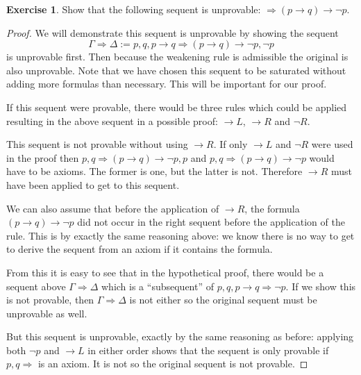 \documentclass{article}
\newcommand{\sequent}[2]{#1\Rightarrow#2}
\theoremstyle{definition}
\newtheorem{question}{Exercise}
\begin{document}
\begin{question}
    Show that the following sequent is unprovable: \(\sequent{}{(p\to q)\to\neg
        p}\).

    \begin{proof}
        We will demonstrate this sequent is unprovable by showing the sequent
        \[
            \sequent{\Gamma}{\Delta}:=\sequent{p,q,p\to q}{(p\to q)\to\neg p,\neg p}
        \]
        is unprovable first. Then because the weakening rule is admissible the
        original is also unprovable. Note that we have chosen this sequent to be
        saturated without adding more formulas than necessary. This will be
        important for our proof.

        If this sequent were provable, there would be three rules which could be
        applied resulting in the above sequent in a possible proof: \(\to L\),
        \(\to R\) and \(\neg R\).

        This sequent is not provable without using \(\to R\). If only \(\to L\)
        and \(\neg R\) were used in the proof then \(\sequent{p,q}{(p\to
            q)\to\neg p,p}\) and \(\sequent{p,q}{(p\to q)\to\neg p}\) would have to
        be axioms. The former is one, but the latter is not. Therefore \(\to R\)
        must have been applied to get to this sequent.

        We can also assume that before the application of \(\to R\), the formula
        \((p\to q)\to\neg p\) did not occur in the right sequent before the
        application of the rule. This is by exactly the same reasoning above:
        we know there is no way to get to derive the sequent from an axiom if
        it contains the formula.

        From this it is easy to see that in the hypothetical proof, there would
        be a sequent above \(\sequent{\Gamma}{\Delta}\) which is a
        ``subsequent'' of \(\sequent{p,q,p\to q}{\neg p}\). If we show this is
        not provable, then \(\sequent{\Gamma}{\Delta}\) is not either so the
        original sequent must be unprovable as well.

        But this sequent is unprovable, exactly by the same reasoning as before:
        applying both \(\neg p\) and \(\to L\) in either order shows that the
        sequent is only provable if \(\sequent{p,q}{}\) is an axiom. It is not
        so the original sequent is not provable.
    \end{proof}
\end{question}
\end{document}
